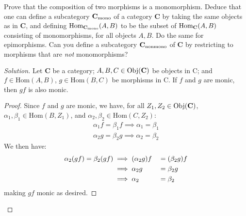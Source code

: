 \documentclass[12pt]{article}
\newenvironment{problem}[2][Problem]{\begin{trivlist}
\item[\hskip \labelsep {\bfseries #1}\hskip \labelsep {\bfseries #2.}]}{\end{trivlist}}
\newcommand{\catname}[1]{\normalfont\textbf{#1}}
\newcommand{\Hom}{\text{Hom}}
\newcommand{\Obj}[1]{\text{Obj}(\catname{C})}
\newenvironment{solution}
  {\renewcommand\qedsymbol{$\blacksquare$}\begin{proof}[Solution]}
{\end{proof}}
\newenvironment{sproof}{%
  \renewcommand\qedsymbol{$\square$}
  \begin{proof}
  }{
  \end{proof}
}
\begin{document}
\begin{problem}{4.4}
  Prove that the composition of two morphisms is a monomorphism. 
Deduce that one can define a subcategory $\catname{C}_{\text{mono}}$ of a category \catname{C} by taking the same objects as in \catname{C}, and defining $\Hom_{\catname{C}_\text{mono}}(A,B)$ to be the subset of $\Hom_{\catname{C}}(A,B)$ consisting of monomorphisms, for all objects $A,B$. 
  Do the same for epimorphisms. 
  Can you define a subcategory $\catname{C}_{\text{nonmono}}$ of \catname{C} by restricting to morphisms that are \textit{not} monomorphisms? 
\end{problem}
\begin{solution}
    Let \catname{C} be a category; 
      $A, B, C \in \Obj{C}$ be objects in C; and
      $f\in\Hom(A,B)$,
      $g\in\Hom(B,C)$ be morphisms in C.
      If $f$ and $g$ are monic, then $gf$ is also monic.
      \begin{sproof}
        Since $f$ and $g$ are monic, we have, for all $Z_1, Z_2 \in \Obj{C}$,
        $\alpha_1, \beta_1 \in \Hom(B,Z_1)$, and
        $\alpha_2, \beta_2 \in \Hom(C, Z_2)$:
        \begin{align*}
          \alpha_1f = \beta_1f \implies \alpha_1 = \beta_1\\
          \alpha_2g = \beta_2g \implies \alpha_2 = \beta_2
        \end{align*}
        We then have:
        \begin{alignat*}{3}\relax
          \alpha_2(gf) = \beta_2(gf) &\implies (\alpha_2g)f &&= (\beta_2g)f\\
          &\implies \alpha_2g &&= \beta_2g\\
          &\implies \alpha_2 &&= \beta_2
        \end{alignat*}
        making $gf$ monic as desired.
      \end{sproof}
      

\end{solution}
\end{document}
